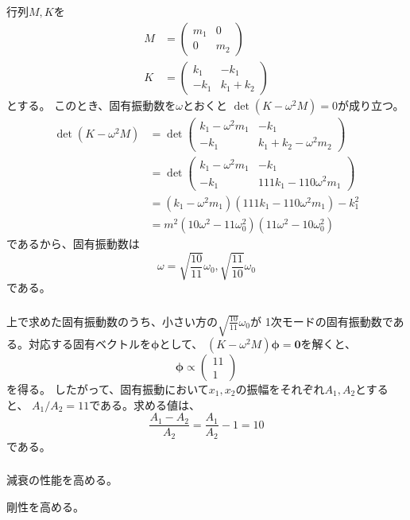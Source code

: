 \documentclass[a4paper]{jsarticle}
\begin{document}
\subsubsection{}
行列$M,K$を
\begin{align}
  M &= 
  \begin{pmatrix}
    m_1 & 0 \\
    0 & m_2
  \end{pmatrix} \\
  K &= 
  \begin{pmatrix}
    k_1 & -k_1 \\
    -k_1 & k_1 + k_2
  \end{pmatrix}
\end{align}
とする。
このとき、固有振動数を$\omega$とおくと
$\det (K - \omega^2 M) = 0$が成り立つ。
\begin{equation}
  \begin{aligned}
    \det (K - \omega^2 M)
    &= \det
    \begin{pmatrix}
      k_1 - \omega^2 m_1 & -k_1 \\
      -k_1 & k_1 + k_2 - \omega^2 m_2
    \end{pmatrix} \\
    &= \det
    \begin{pmatrix}
      k_1 - \omega^2 m_1 & -k_1 \\
      -k_1 & 111 k_1 - 110 \omega^2 m_1
    \end{pmatrix} \\
    &= (k_1 - \omega^2 m_1) (111 k_1 - 110 \omega^2 m_1) - k_1^2 \\
    &= m^2 (10 \omega^2 - 11 \omega_0^2) (11 \omega^2 - 10 \omega_0^2)
  \end{aligned}
\end{equation}
であるから、固有振動数は
\begin{equation}
  \omega = \sqrt{\frac{10}{11}} \omega_0,
  \sqrt{\frac{11}{10}} \omega_0
\end{equation}
である。

\subsubsection{}
上で求めた固有振動数のうち、小さい方の$\sqrt{\frac{10}{11}} \omega_0$が
1次モードの固有振動数である。対応する固有ベクトルを$\boldsymbol{\phi}$として、
$(K - \omega^2 M) \boldsymbol{\phi} = \boldsymbol{0}$を解くと、
\begin{equation}
  \boldsymbol{\phi} \propto
  \begin{pmatrix}
    11 \\ 1
  \end{pmatrix}
\end{equation}
を得る。
したがって、固有振動において$x_1,x_2$の振幅をそれぞれ$A_1,A_2$とすると、
$A_1 / A_2 = 11$である。求める値は、
\begin{equation}
  \frac{A_1 - A_2}{A_2}
  = \frac{A_1}{A_2} - 1 = 10
\end{equation}
である。

\subsubsection{}
減衰の性能を高める。\par
剛性を高める。
\end{document}
